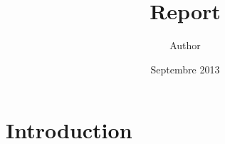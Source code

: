 \documentclass[a4paper12pt]{article}
\title{Report}
\author{Author}
\date{Septembre 2013}
\begin{document}


\maketitle
\newpage


\section{Introduction}
\end{document}
